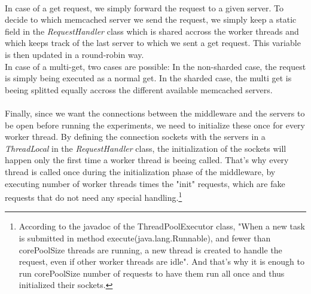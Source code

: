 \documentclass[11pt,a4paper]{article}
\begin{document}
\\
In case of a get request, we simply forward the request to a given server. To decide to which memcached server we send the request, we simply keep a static field in the \textit{RequestHandler} class which is shared accross the worker threads and which keeps track of the last server to which we sent a get request. This variable is then updated in a round-robin way. 
\\
In case of a multi-get, two cases are possible: In the non-sharded case, the request is simply being executed as a normal get. In the sharded case, the multi get is beeing splitted equally accross the different available memcached servers.   
\\\\
Finally, since we want the connections between the middleware and the servers to be open before running the experiments, we need to initialize these once for every worker thread. By defining the connection sockets with the servers in a \textit{ThreadLocal} in the \textit{RequestHandler} class, the initialization of the sockets will happen only the first time a worker thread is beeing called. That's why every thread is called once during the initialization phase of the middleware, by executing number of worker threads times the "init" requests, which are fake requests that do not need any special handling.\footnote{According to the javadoc of the ThreadPoolExecutor class, "When a new task is submitted in method execute(java.lang.Runnable), and fewer than corePoolSize threads are running, a new thread is created to handle the request, even if other worker threads are idle". And that's why it is enough to run corePoolSize number of requests to have them run all once and thus initialized their sockets.} 
\end{document}
